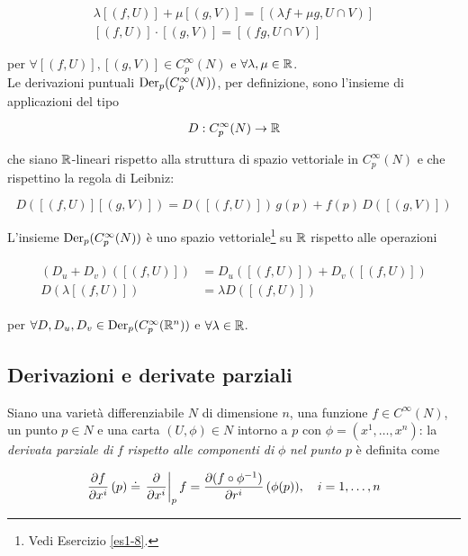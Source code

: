 \begin{gather}
	\lambda [(f,U)] + \mu [(g,V)] = [(\lambda f + \mu g , U \cap V)]\\
	[(f,U)] \cdot [(g,V)] = [(f g , U \cap V)]
\end{gather}

per $ \forall [(f,U)], [(g,V)] \in C_{p}^{\infty}(N) $ e $ \forall \lambda, \mu \in \mathbb{R} $.\\
Le derivazioni puntuali $ \operatorname{Der}_{p}(C_{p}^{\infty}(N)) $, per definizione, sono l'insieme di applicazioni del tipo

\begin{equation}
	D : C_{p}^{\infty}(N) \to \mathbb{R}
\end{equation}

che siano $ \mathbb{R} $-lineari rispetto alla struttura di spazio vettoriale in $ C_{p}^{\infty}(N) $ e che rispettino la regola di Leibniz:

\begin{equation}
	D([(f,U)] [(g,V)]) = D([(f,U)]) \, g(p) + f(p) \, D([(g,V)])
\end{equation}

L'insieme $ \operatorname{Der}_{p}(C_{p}^{\infty}(N)) $ è uno spazio vettoriale\footnote{%
	Vedi Esercizio \ref{es1-8}.%
} su $ \mathbb{R} $ rispetto alle operazioni

\begin{align}
	\begin{split}
		(D_{u} + D_{v}) ([(f,U)]) &= D_{u}([(f,U)]) + D_{v}([(f,U)])\\
		D (\lambda [(f,U)]) &= \lambda D ([(f,U)])
	\end{split}
\end{align}

per $ \forall D,D_{u},D_{v} \in \operatorname{Der}_{p}(C_{p}^{\infty}(\mathbb{R}^{n})) $ e $ \forall \lambda \in \mathbb{R} $.

\subsection{Derivazioni e derivate parziali}

Siano una varietà differenziabile $ N $ di dimensione $ n $, una funzione $ f \in C^{\infty}(N) $, un punto $ p \in N $ e una carta $ (U, \phi) \in N $ intorno a $ p $ con $ \phi = (x^{1},\dots,x^{n}) $: la \textit{derivata parziale di} $ f $ \textit{rispetto alle componenti di} $ \phi $ \textit{nel punto} $ p $ è definita come

\begin{equation}
	\pdv{f}{x^{i}} \, (p) \doteq \eval{ \pdv{x^{i}} }_{p} f = \pdv{(f \circ \phi^{-1})}{r^{i}} \, (\phi(p)) \qcomma i=1,\dots,n
\end{equation}

